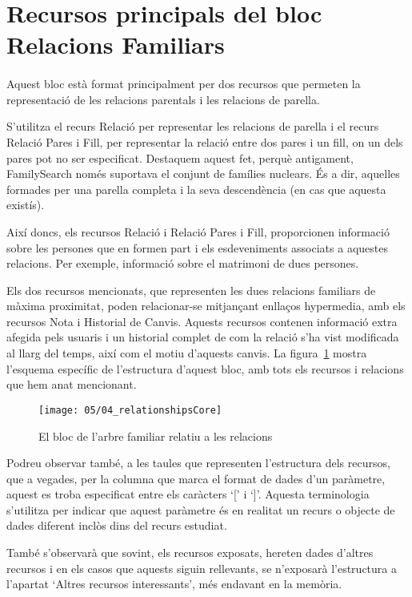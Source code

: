 \section{Recursos principals del bloc Relacions Familiars}

    \paragraph{}
    Aquest bloc està format principalment per dos recursos que permeten la representació de les relacions parentals i les relacions de parella.

    S'utilitza el recurs Relació per representar les relacions de parella i el recurs Relació Pares i Fill, per representar la relació entre dos pares i un fill, on un dels pares pot no ser especificat. Destaquem aquest fet, perquè antigament, FamilySearch només suportava el conjunt de famílies nuclears. És a dir, aquelles formades per una parella completa i la seva descendència (en cas que aquesta existís).

    Així doncs, els recursos Relació i Relació Pares i Fill, proporcionen informació sobre les persones que en formen part i els esdeveniments associats a aquestes relacions. Per exemple, informació sobre el matrimoni de dues persones.

    Els dos recursos mencionats, que representen les dues relacions familiars de màxima proximitat, poden relacionar-se mitjançant enllaços hypermedia, amb els recursos Nota i Historial de Canvis. Aquests recursos contenen informació extra afegida pels usuaris i un historial complet de com la relació s'ha vist modificada al llarg del temps, així com el motiu d'aquests canvis. La figura~\ref{img:relationshipsBloc} mostra l'esquema específic de l'estructura d'aquest bloc, amb tots els recursos i relacions que hem anat mencionant.

    \begin{figure}[h]
        \texttt{[image: 05/04\_relationshipsCore]}
        \centering
        \caption{El bloc de l'arbre familiar relatiu a les relacions}\label{img:relationshipsBloc}
    \end{figure}

    Podreu observar també, a les taules que representen l'estructura dels recursos, que a vegades, per la columna que marca el format de dades d'un paràmetre, aquest es troba especificat entre els caràcters `[' i `]'. Aquesta terminologia s'utilitza per indicar que aquest paràmetre és en realitat un recurs o objecte de dades diferent inclòs dins del recurs estudiat.

    També s'observarà que sovint, els recursos exposats, hereten dades d'altres recursos i en els casos que aquests siguin rellevants, se n'exposarà l'estructura a l'apartat `Altres recursos interessants', més endavant en la memòria.

    
    
